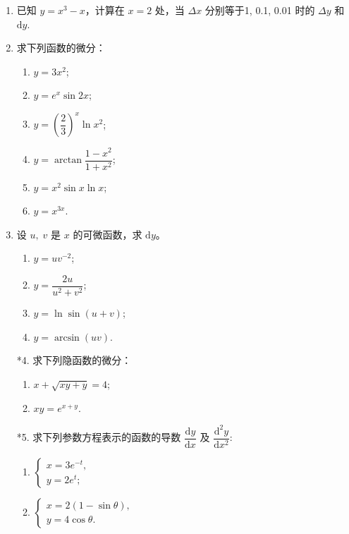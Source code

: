 \begin{enumerate}\setlength{\itemsep}{7pt}
    \item 已知 $y=x^3-x$，计算在 $x=2$ 处，当 $\Delta x$ 分别等于1, 0.1, 0.01 时的 $\Delta y$ 和 $\text{d}y$.
    
    \item 求下列函数的微分：
    \begin{enumerate}[(1)]\setlength{\itemsep}{5pt}\setlength{\topsep}{15pt}
        \item $y=3x^2$;
        \item $y=e^x\sin 2x$;
        \item $y=\left(\dfrac{2}{3}\right)^x\ln x^2$;
        \item $y=\arctan\dfrac{1-x^2}{1+x^2}$;
        \item $y=x^2\sin x\ln x$;
        \item $y=x^{3x}$.
    \end{enumerate}

    \item 设 $u,\;v$ 是 $x$ 的可微函数，求 $\text{d}y$。
    \begin{enumerate}[(1)]\setlength{\itemsep}{5pt}\setlength{\topsep}{15pt}
        \item $y=uv^{-2}$;
        \item $y=\dfrac{2u}{u^2+v^2}$;
        \item $y=\ln\sin(u+v)$;
        \item $y=\arcsin(uv)$.
    \end{enumerate}

    \item[*4.] 求下列隐函数的微分：
    \begin{enumerate}[(1)]\setlength{\itemsep}{5pt}\setlength{\topsep}{15pt}
        \item $x+\sqrt{xy+y}=4$;
        \item $xy=e^{x+y}$.
    \end{enumerate}

    \item[*5.] 求下列参数方程表示的函数的导数 $\dfrac{\text{d}y}{\text{d}x}$ 及 $\dfrac{\text{d}^2y}{\text{d}x^2}$:
    \begin{enumerate}[(1)]\setlength{\itemsep}{5pt}\setlength{\topsep}{15pt}
        \item $\begin{cases}
            x=3e^{-t},\\
            y=2e^{t};
        \end{cases}$
        \item $\begin{cases}
            x=2(1-\sin\theta),\\
            y=4\cos\theta.
        \end{cases}$
    \end{enumerate}


\end{enumerate}
